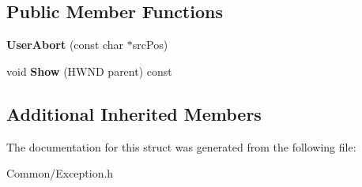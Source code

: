 \subsection*{Public Member Functions}
\begin{DoxyCompactItemize}
\item 
\mbox{\label{struct_gost_crypt_1_1_user_abort_a988ef873d164bcb7d8881f457204f050}} 
{\bfseries User\+Abort} (const char $\ast$src\+Pos)
\item 
\mbox{\label{struct_gost_crypt_1_1_user_abort_ab00678ea968fa161030b016b134a1d05}} 
void {\bfseries Show} (H\+W\+ND parent) const
\end{DoxyCompactItemize}
\subsection*{Additional Inherited Members}


The documentation for this struct was generated from the following file\+:\begin{DoxyCompactItemize}
\item 
Common/Exception.\+h\end{DoxyCompactItemize}
